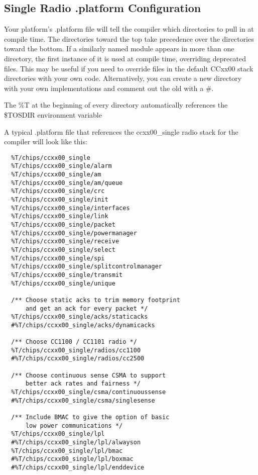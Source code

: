 \documentclass{article}
\begin{document}
\subsection{Single Radio .platform Configuration}
Your platform's .platform file will tell the compiler which directories to pull in at
compile time.  The directories toward the top take precedence over the directories toward
the bottom.  If a similarly named module appears in more than one directory, the first
instance of it is used at compile time, overriding deprecated files. This may be
useful if you need to override files in the default CCxx00 stack directories with your own
code.  Alternatively, you can create a new directory with your own implementations and
comment out the old with a \#.

The \%T at the beginning of every directory automatically references the \$TOSDIR environment variable

A typical .platform file that references the ccxx00\_single radio stack for the compiler will look 
like this:

\begin{verbatim}
  %T/chips/ccxx00_single
  %T/chips/ccxx00_single/alarm
  %T/chips/ccxx00_single/am
  %T/chips/ccxx00_single/am/queue
  %T/chips/ccxx00_single/crc
  %T/chips/ccxx00_single/init
  %T/chips/ccxx00_single/interfaces
  %T/chips/ccxx00_single/link
  %T/chips/ccxx00_single/packet
  %T/chips/ccxx00_single/powermanager
  %T/chips/ccxx00_single/receive
  %T/chips/ccxx00_single/select
  %T/chips/ccxx00_single/spi
  %T/chips/ccxx00_single/splitcontrolmanager
  %T/chips/ccxx00_single/transmit
  %T/chips/ccxx00_single/unique
  
  /** Choose static acks to trim memory footprint 
      and get an ack for every packet */
  %T/chips/ccxx00_single/acks/staticacks
  #%T/chips/ccxx00_single/acks/dynamicacks
  
  /** Choose CC1100 / CC1101 radio */
  %T/chips/ccxx00_single/radios/cc1100
  #%T/chips/ccxx00_single/radios/cc2500
  
  /** Choose continuous sense CSMA to support 
      better ack rates and fairness */
  %T/chips/ccxx00_single/csma/continuoussense
  #%T/chips/ccxx00_single/csma/singlesense
  
  /** Include BMAC to give the option of basic 
      low power communications */
  %T/chips/ccxx00_single/lpl
  #%T/chips/ccxx00_single/lpl/alwayson
  %T/chips/ccxx00_single/lpl/bmac
  #%T/chips/ccxx00_single/lpl/boxmac
  #%T/chips/ccxx00_single/lpl/enddevice
  
\end{verbatim}
\end{document}
